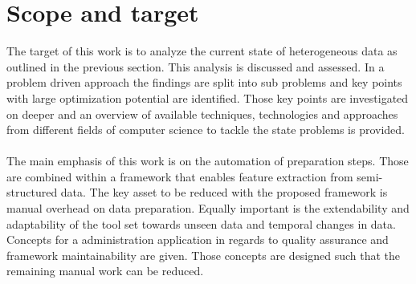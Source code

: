 \section{Scope and target\label{sec:scope}}
The target of this work is to analyze the current state of heterogeneous data as outlined in the previous section. This analysis is discussed and assessed. In a problem driven approach the findings are split into sub problems and key points with large optimization potential are identified. Those key points are investigated on deeper and an overview of available techniques, technologies and approaches from different fields of computer science to tackle the state problems is provided.
\\\\
The main emphasis of this work is on the automation of preparation steps. Those are combined within a framework that enables feature extraction from semi-structured data. The key asset to be reduced with the proposed framework is manual overhead on data preparation. Equally important is the extendability and adaptability of the tool set towards unseen data and temporal changes in data. Concepts for a administration application in regards to quality assurance and framework maintainability are given. Those concepts are designed such that the remaining manual work can be reduced. 

